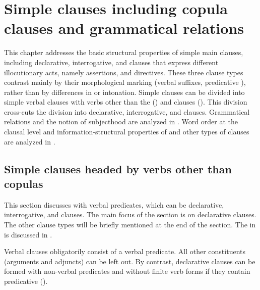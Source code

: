 \chapter{Simple clauses including copula clauses and grammatical relations}
\label{cpt:Simpleclauses}

This chapter addresses the basic structural properties of simple main clauses, including declarative, interrogative,  and  clauses that express different illocutionary acts, namely assertions,  and directives. These three clause types contrast mainly by their morphological marking (verbal suffixes, predicative ), rather than by differences in  or intonation. Simple clauses can be divided into simple verbal clauses with verbs other than the  () and  clauses (). This division cross-cuts the division into declarative, interrogative,  and  clauses. Grammatical relations and the notion of subjecthood are analyzed in . Word order at the clausal level and information-structural properties of  and other types of clauses are analyzed in . 



\section{Simple clauses headed by verbs other than copulas}
\label{sec:Simple clauses headed by verbs other than copulae}

This section discusses  with verbal predicates, which can be declarative, interrogative,  and  clauses. The main focus of the section is on declarative clauses. The other clause types will be briefly mentioned at the end of the section. The  in  is discussed in .

Verbal clauses obligatorily consist of a verbal predicate. All other constituents (arguments and adjuncts) can be left out. By contrast, declarative  clauses can be formed with non-verbal predicates and without finite verb forms if they contain predicative  ().  

